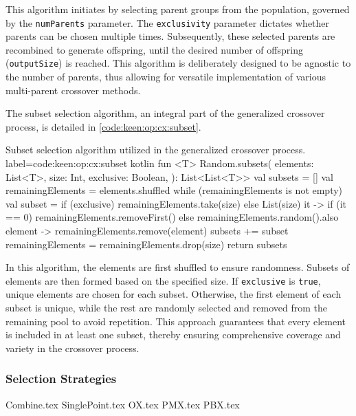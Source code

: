         This algorithm initiates by selecting parent groups from the population, governed by the \texttt{numParents} 
        parameter. The \texttt{exclusivity} parameter dictates whether parents can be chosen multiple times. 
        Subsequently, these selected parents are recombined to generate offspring, until the desired number of offspring 
        (\texttt{outputSize}) is reached. This algorithm is deliberately designed to be agnostic to the number of 
        parents, thus allowing for versatile implementation of various multi-parent crossover methods.

        The subset selection algorithm, an integral part of the generalized crossover process, is detailed in 
        \vref{code:keen:op:cx:subset}.

        \begin{code}{
            Subset selection algorithm utilized in the generalized crossover process.
        }{
            label=code:keen:op:cx:subset
        }{kotlin}
            fun <T> Random.subsets(
                elements: List<T>,
                size: Int,
                exclusive: Boolean,
            ): List<List<T>> {
                val subsets = []
                val remainingElements = elements.shuffled
                while (remainingElements is not empty) {
                    val subset = if (exclusive) {
                        remainingElements.take(size)
                    } else {
                        List(size) { it ->
                            if (it == 0) remainingElements.removeFirst()
                            else remainingElements.random().also { 
                                element -> remainingElements.remove(element) 
                            }
                        }
                    }
                    subsets += subset
                    remainingElements = remainingElements.drop(size)
                }
                return subsets
            }
        \end{code}

        In this algorithm, the elements are first shuffled to ensure randomness. Subsets of elements are then formed 
        based on the specified size. If \texttt{exclusive} is \texttt{true}, unique elements are chosen for each subset. 
        Otherwise, the first element of each subset is unique, while the rest are randomly selected and removed from the 
        remaining pool to avoid repetition. This approach guarantees that every element is included in at least one 
        subset, thereby ensuring comprehensive coverage and variety in the crossover process.

    \subsubsection{Selection Strategies}
    {Combine.tex}
    {SinglePoint.tex}
    {OX.tex}
    {PMX.tex}
    {PBX.tex}
  